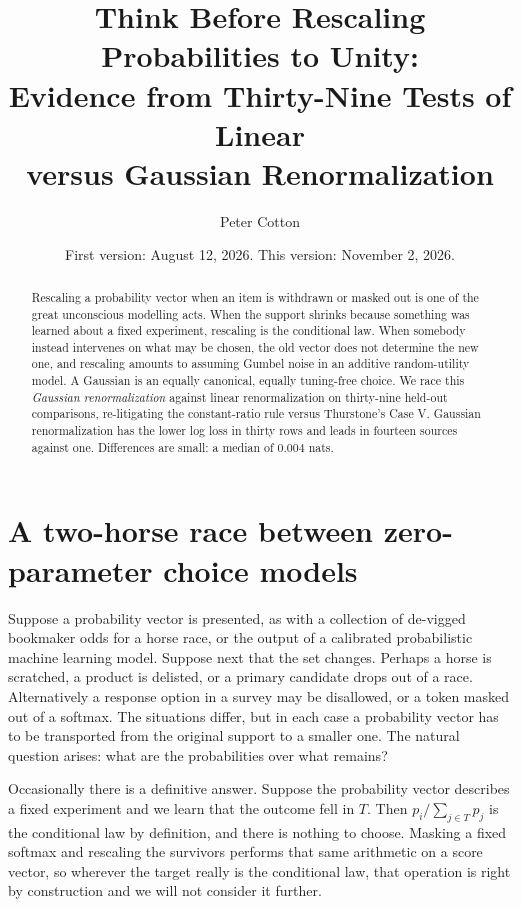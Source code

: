 \documentclass[11pt]{article}
\title{Think Before Rescaling Probabilities to Unity:\\Evidence from Thirty-Nine Tests of Linear\\versus Gaussian Renormalization}
\author{Peter Cotton}
\date{First version: August 12, 2026. This version: November 2, 2026.}
\theoremstyle{italichead}
\begin{document}
\maketitle

\begin{abstract}
\noindent Rescaling a probability vector when an item is withdrawn or masked out is one of the
great unconscious modelling acts. When the support shrinks because something was learned about a
fixed experiment, rescaling is the conditional law. When somebody instead intervenes on what may
be chosen, the old vector does not determine the new one, and rescaling amounts to assuming
Gumbel noise in an additive random-utility model\footnotemark[1]. A Gaussian is an equally
canonical, equally tuning-free choice. We race this \emph{Gaussian renormalization} against linear
renormalization on thirty-nine held-out comparisons, re-litigating the constant-ratio rule versus
Thurstone's Case V. Gaussian renormalization has the lower log loss in thirty rows and leads in
fourteen sources against one. Differences are small: a median of $0.004$ nats.
\end{abstract}


\section{A two-horse race between zero-parameter choice models}
\label{sec:problem}

Suppose a probability vector is presented, as with a collection of de-vigged bookmaker odds for a
horse race, or the output of a calibrated probabilistic machine learning model. Suppose next that
the set changes. Perhaps a horse is scratched, a product is delisted, or a primary candidate
drops out of a race. Alternatively a response option in a survey may be disallowed, or a token
masked out of a softmax. The situations differ, but in each
case a probability vector has to be transported from the original support to a smaller one. The
natural question arises: what are the probabilities over what remains?

Occasionally there is a definitive answer. Suppose the
probability vector describes a fixed experiment and we learn that the outcome fell in $T$. Then
$p_i / \sum_{j \in T} p_j$ is the conditional law by definition, and there is nothing to choose.
Masking a fixed softmax and rescaling the survivors performs that same arithmetic on a score
vector, so wherever the target really is the conditional law, that operation is right by
construction and we will not consider it further.
\end{document}
